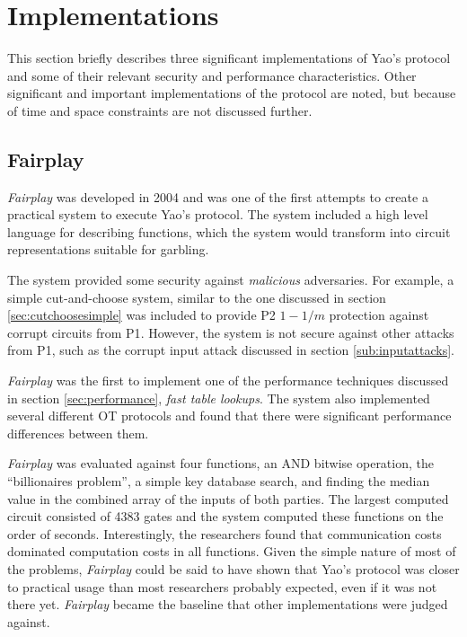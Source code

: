 \section{Implementations}
\label{sec:implementations}

This section briefly describes three significant implementations of Yao's protocol and some of their relevant security and performance characteristics. Other significant and important implementations of the protocol are noted\cite{nielsen2009lego, shen2011two}, but because of time and space constraints are not discussed further.

\subsection{Fairplay}

\emph{Fairplay}\cite{malkhi2004fairplay} was developed in 2004 and was one of the first attempts to create a practical system to execute Yao's protocol.  The system included a high level language for describing functions, which the system would transform into circuit representations suitable for garbling.

The system provided some security against \emph{malicious} adversaries.  For example, a simple cut-and-choose system, similar to the one discussed in section \ref{sec:cutchoosesimple} was included to provide \ac{P2} $1 - 1/m$ protection against corrupt circuits from \ac{P1}.  However, the system is not secure against other attacks from \ac{P1}, such as the corrupt input attack discussed in section \ref{sub:inputattacks}.

\emph{Fairplay} was the first to implement one of the performance techniques discussed in section \ref{sec:performance}, \emph{fast table lookups}.  The system also implemented several different \ac{OT} protocols and found that there were significant performance differences between them.

 \emph{Fairplay} was evaluated against four functions, an AND bitwise operation, the ``billionaires problem'', a simple key database search, and finding the median value in the combined array of the inputs of both parties.  The largest computed circuit consisted of 4383 gates and the system computed these functions on the order of seconds.  Interestingly, the researchers found that communication costs dominated computation costs in all functions. Given the simple nature of most of the problems, \emph{Fairplay} could be said to have shown that Yao's protocol was closer to practical usage than most researchers probably expected, even if it was not there yet. \emph{Fairplay} became the baseline that other implementations were judged against.


